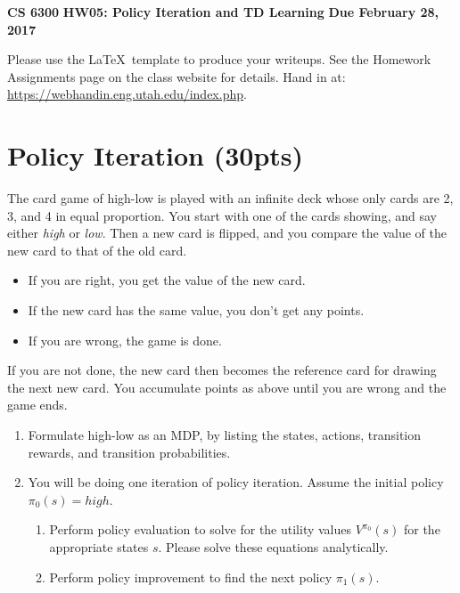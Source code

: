 \documentclass[12pt]{article}
\begin{document}
\begin{center}
{\bf CS 6300} \hfill {\large\bf HW05: Policy Iteration and TD Learning} \hfill {\bf Due February 28, 2017}
\end{center}

\noindent
Please use the \LaTeX\ template to produce your writeups. See the
Homework Assignments page on the class website for details.  Hand in
at: \url{https://webhandin.eng.utah.edu/index.php}.

\section{Policy Iteration (30pts)}

The card game of high-low is played with an infinite deck whose only
cards are 2, 3, and 4 in equal proportion.  You start with one of the
cards showing, and say either {\it high} or {\it low}.  Then a new
card is flipped, and you compare the value of the new card to that of
the old card.

\begin{itemize}

\item If you are right, you get the value of the new card.

\item If the new card has the same value, you don't get any points.

\item If you are wrong, the game is done.

\end{itemize}

\noindent
If you are not done, the new card then becomes the reference card for
drawing the next new card.  You accumulate points as above until you
are wrong and the game ends.

\begin{enumerate}

\item Formulate high-low as an MDP, by listing the states, actions,
  transition rewards, and transition probabilities.  

\item You will be doing one iteration of policy iteration.  Assume the
  initial policy $\pi_0(s) = high$.

  \begin{enumerate}

 \item Perform policy evaluation to solve for the utility values
  $V^{\pi_0}(s)$ for the appropriate states $s$.  Please solve these
  equations analytically.

  \item Perform policy improvement to find the next policy $\pi_1(s)$.

  \end{enumerate}

\end{enumerate}
\end{document}
